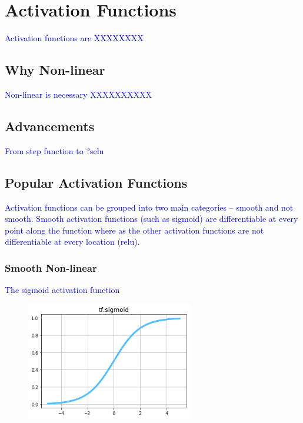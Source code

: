 \section{Activation Functions}

\textcolor{blue}{Activation functions are XXXXXXXX}

\subsection{Why Non-linear}

\textcolor{blue}{Non-linear is necessary XXXXXXXXXX}

\subsection{Advancements}

\textcolor{blue}{From step function to ?selu}

\subsection{Popular Activation Functions}

\textcolor{blue}{Activation functions can be grouped into two main categories -- smooth and not smooth. Smooth activation functions (such as sigmoid) are differentiable at every point along the function where as the other activation functions are not differentiable at every location (relu).}

\subsubsection{Smooth Non-linear}

\textcolor{blue}{The sigmoid activation function}

\begin{figure}
\centering
\includegraphics[width=0.65\textwidth]{./sync_imgs/act/smooth/sigmoid.png}
\label{fig:act_smooth_sigmoid}
\end{figure}

